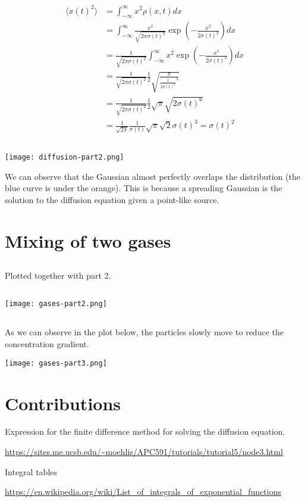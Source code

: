 \documentclass[10pt]{article}
\begin{document}
\begin{align*}
\langle x(t)^2 \rangle &= \int_{-\infty}^{\infty} x^2 \rho(x, t) dx\\
&= \int_{-\infty}^{\infty} \frac{x^2}{\sqrt{2 \pi \sigma(t)^{2}}} \exp(-\frac{x^{2}}{2\sigma(t)^{2}})  dx\\
&= \frac{1}{\sqrt{2 \pi \sigma(t)^{2}}}  \int_{-\infty}^{\infty} x^{2} \exp(-\frac{x^{2}}{2\sigma(t)^{2}})  dx \\
&= \frac{1}{\sqrt{2 \pi \sigma(t)^{2}}} \frac{1}{2}\sqrt{\frac{\pi}{\frac{1}{2\sigma(t)^{2}}^{3}}} \\
&= \frac{1}{\sqrt{2 \pi \sigma(t)^{2}}} \frac{1}{2} \sqrt{\pi} \sqrt{2\sigma(t)^{6}} \\
&= \frac{1}{\sqrt{2 \pi}} \frac{1}{\sigma(t)} \sqrt{\pi} \sqrt{2} \sigma(t)^{3} = \sigma(t)^{2}
\end{align*}
\subsection{}
\texttt{[image: diffusion-part2.png]}

We can observe that the Gaussian almost perfectly overlaps the distribution (the blue curve is under the orange). This is because a spreading Gaussian is the solution to the diffusion equation given a point-like source.

\section{Mixing of two gases}
\subsection{}
Plotted together with part 2.
\subsection{}
\texttt{[image: gases-part2.png]}

\subsection{}
As we can observe in the plot below, the particles slowly move to reduce the concentration gradient.

\texttt{[image: gases-part3.png]}


\section{Contributions}
Expression for the finite difference method for solving the diffusion equation.

\url{https://sites.me.ucsb.edu/~moehlis/APC591/tutorials/tutorial5/node3.html}

Integral tables

\url{https://en.wikipedia.org/wiki/List_of_integrals_of_exponential_functions}
\end{document}
